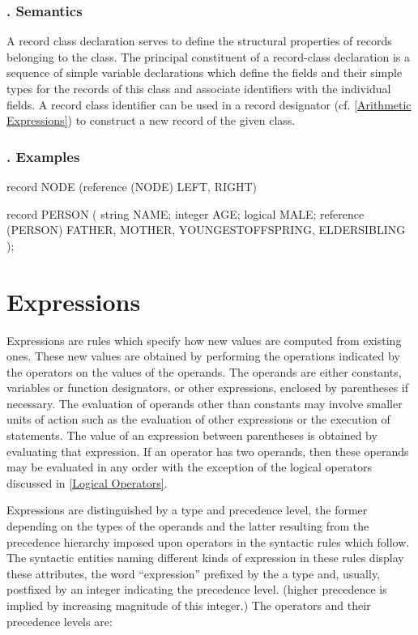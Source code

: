 \documentclass[a4paper]{article}
\def\quietsubsubsection#1{\addtocounter{subsubsection}{1}\subsubsection*{\thesubsubsection. #1}}
\def\Semantics{\quietsubsubsection{Semantics}}
\def\Examples{\quietsubsubsection{Examples}}
\begin{document}
\Semantics

A record class declaration serves to define the structural properties
of records belonging to the class. The principal constituent of a
record-class declaration is a sequence of simple variable declarations
which define the fields and their simple types for the records of this
class and associate identifiers with the individual fields.  A record
class identifier can be used in a record designator
(cf. \ref{Arithmetic Expressions}) to construct a new record of the
given class.

\newpage
\Examples

\begin{AlgolWExample}
record NODE (reference (NODE) LEFT, RIGHT)
\end{AlgolWExample}

\begin{AlgolWExample}
record PERSON ( 
    string NAME; 
    integer AGE; 
    logical MALE;
    reference (PERSON) FATHER, MOTHER, YOUNGESTOFFSPRING, ELDERSIBLING 
);
\end{AlgolWExample}



\newpage
\section{Expressions}
\label{Expressions}

Expressions are rules which specify how new values are computed from
existing ones. These new values are obtained by performing the
operations indicated by the operators on the values of the operands.
The operands are either constants, variables or function designators,
or other expressions, enclosed by parentheses if necessary.  The
evaluation of operands other than constants may involve smaller units
of action such as the evaluation of other expressions or the execution
of statements. The value of an expression between parentheses is
obtained by evaluating that expression. If an operator has two
operands, then these operands may be evaluated in any order with the
exception of the logical operators discussed in \ref{Logical
  Operators}.

\label{Precedence of Operators}

Expressions are distinguished by a type and precedence level, the
former depending on the types of the operands and the latter resulting
from the precedence hierarchy imposed upon operators in the syntactic
rules which follow. The syntactic entities naming different kinds of
expression in these rules display these attributes, the word
``expression'' prefixed by the a type and, usually, postfixed by an
integer indicating the precedence level. (higher precedence is implied
by increasing magnitude of this integer.) The operators and their
precedence levels are:
\end{document}
